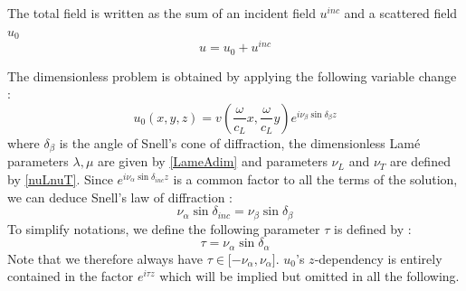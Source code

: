 The total field is written as the sum of an incident field $u^{inc}$ and a scattered field $u_0$
\begin{equation}
u=u_0+u^{inc}
\label{C4:scat}
\end{equation}

The dimensionless problem is obtained by applying the following variable change :
\begin{equation}
u_0(x,y,z)=v\left( \frac{\omega}{c_L} x, \frac{\omega}{c_L} y \right)e^{i\nu_{\beta}\sin\delta_{\beta}z}
\label{C4:adiming}
\end{equation}
where $\delta_{\beta}$ is the angle of Snell's cone of diffraction, the dimensionless Lamé parameters $\lambda,\mu$ are given by \eqref{LameAdim} and parameters $\nu_L$ and $\nu_T$ are defined by \eqref{nuLnuT}. Since $e^{i\nu_{\alpha}\sin\delta_{inc}z}$ is a common factor to all the terms of the solution, we can deduce Snell's law of diffraction :
\begin{equation}
\nu_{\alpha}\sin\delta_{inc}=\nu_{\beta}\sin\delta_{\beta}
\label{C4:Snelldiff}
\end{equation}
To simplify notations, we define the following parameter $\tau$ is defined by :
\begin{equation}
\tau=\nu_{\alpha}\sin\delta_{\alpha}
\label{deftau}
\end{equation}
Note that we therefore always have $\tau \in \lbrack -\nu_{\alpha}, \nu_{\alpha} \rbrack$. $u_0$'s $z$-dependency is entirely contained in the factor $e^{i\tau z}$ which will be implied but omitted in all the following.

